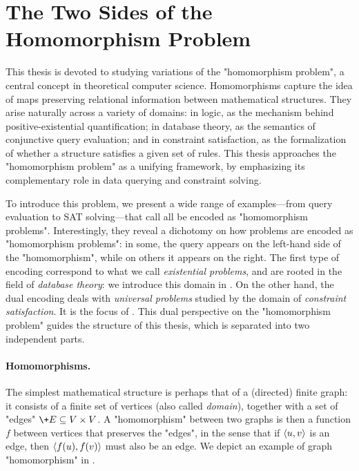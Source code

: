\section{The Two Sides of the Homomorphism Problem}

This thesis is devoted to studying variations of the "homomorphism problem",
a central concept in theoretical computer science.
Homomorphisms capture the idea of maps preserving relational information between mathematical structures.
They arise naturally across a variety of domains: in logic, as the mechanism behind positive-existential quantification; in database theory, as the semantics of conjunctive query evaluation; and in constraint satisfaction, as the formalization of whether a structure
satisfies a given set of rules. This thesis approaches the "homomorphism problem" as a unifying framework, by emphasizing its complementary role in data querying and constraint solving.

To introduce this problem, we present a wide range of examples---from
query evaluation to SAT solving---that call all be encoded as
"homomorphism problems".
Interestingly, they reveal a dichotomy on how problems are encoded as "homomorphism problems":
in some, the query appears on the left-hand side of the "homomorphism", 
while on others it appears on the right.
The first type of encoding correspond to what we call \emph{existential problems},
and are rooted in the field of \emph{database theory}:
we introduce this domain in .
On the other hand, the dual encoding deals with \emph{universal problems}
studied by the domain of \emph{constraint satisfaction}.
It is the focus of .
This dual perspective on the "homomorphism problem" guides the structure of
this thesis, which is separated into two independent parts.

\paragraph*{Homomorphisms.}
The simplest mathematical structure is perhaps that of a (directed) finite graph:
it consists of a finite set of vertices (also called \emph{domain}),
together with a set of "edges" $\+E \subseteq V \times V$.
A "homomorphism" between two graphs is then a
function $f$ between vertices that preserves
the "edges", in the sense that if $\langle u,v\rangle$ is an edge, then
$\langle f(u),f(v)\rangle$ must also be an edge. We depict
an example of graph "homomorphism" in .


